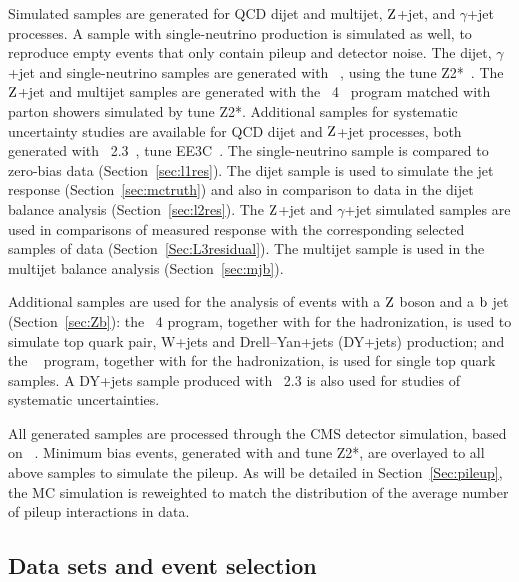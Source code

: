 \documentclass[11pt,twoside,a4paper,cmspaper,final,collab]{cms-tdr}
\begin{document}
Simulated samples are generated for QCD dijet and multijet, $\mathrm{Z}$+jet, and $\gamma$+jet processes.
A sample with single-neutrino production is simulated as well, to reproduce empty events that only contain pileup and detector noise.
The dijet, $\gamma$+jet and single-neutrino samples are generated with {}~\cite{Sjostrand:2006za}, using the tune Z2*~\cite{GEN-14-001}.
The $\mathrm{Z}$+jet and multijet samples are generated with the {\MADGRAPH}~4~\cite{madgraph} program matched with parton showers simulated by {} tune Z2*.
Additional samples for systematic uncertainty studies are available for QCD dijet and $\mathrm{Z}$+jet processes, both
generated with {\HERWIGpp}~2.3~\cite{Bahr:2008pv}, tune EE3C~\cite{Gieseke:2012ft}.
The single-neutrino sample is compared to zero-bias data (Section~\ref{sec:l1res}).
The dijet sample is used to simulate the jet response (Section~\ref{sec:mctruth}) and also in comparison to data in the dijet balance analysis (Section~\ref{sec:l2res}).
The $\mathrm{Z}$+jet and $\gamma$+jet simulated samples are used in comparisons of measured response with the corresponding selected samples of data (Section~\ref{Sec:L3residual}).
The multijet sample is used in the multijet balance analysis (Section~\ref{sec:mjb}).

Additional samples are used for the analysis of events with a $\mathrm{Z}$ boson and a $\mathrm{b}$ jet (Section~\ref{sec:Zb}): the {\MADGRAPH}~4 program,
together with  for the hadronization, is used to simulate top quark pair, W+jets and Drell--Yan+jets (DY+jets) production;
and the \POWHEG~\cite{Frixione:2007vw} program, together with  for the hadronization, is used for single top quark samples.
A DY+jets sample produced with \HERWIGpp~2.3 is also used for studies of systematic uncertainties.

All generated samples are processed through the CMS detector simulation, based on {\GEANTfour}~\cite{Agostinelli:2002hh}.
Minimum bias events, generated with  and tune Z2*, are overlayed to all above samples to simulate the pileup.
As will be detailed in Section~\ref{Sec:pileup},
the MC simulation is reweighted to match the distribution of the average number of pileup interactions in data.

\subsection{Data sets and event selection}
\label{sec:event_sel}
\end{document}
